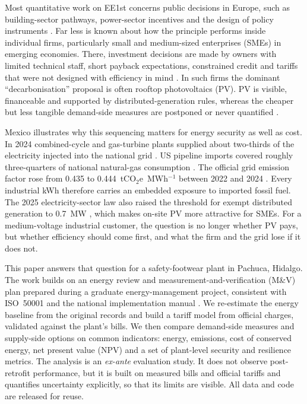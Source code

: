 \documentclass[preprint,12pt,authoryear]{elsarticle}
\begin{document}
Most quantitative work on EE1st concerns public decisions in Europe, such as building-sector pathways, power-sector incentives and the design of policy instruments \citep{mandel2022,pato2022,mandel2023,mandel2024}. Far less is known about how the principle performs inside individual firms, particularly small and medium-sized enterprises (SMEs) in emerging economies. There, investment decisions are made by owners with limited technical staff, short payback expectations, constrained credit and tariffs that were not designed with efficiency in mind \citep{cagno2013,trianni2017,kalantzis2019,zhang2025credit,herce2024}. In such firms the dominant ``decarbonisation'' proposal is often rooftop photovoltaics (PV). PV is visible, financeable and supported by distributed-generation rules, whereas the cheaper but less tangible demand-side measures are postponed or never quantified \citep{fleiter2012,thollander2025}.

Mexico illustrates why this sequencing matters for energy security as well as cost. In 2024 combined-cycle and gas-turbine plants supplied about two-thirds of the electricity injected into the national grid \citep{sener2025plan}. US pipeline imports covered roughly three-quarters of national natural-gas consumption \citep{eia2025mexico}. The official grid emission factor rose from 0.435 to 0.444~tCO$_2$e~MWh$^{-1}$ between 2022 and 2024 \citep{cre2023fesen2022,cre2024fesen2023,semarnat2025fesen}. Every industrial kWh therefore carries an embedded exposure to imported fossil fuel. The 2025 electricity-sector law also raised the threshold for exempt distributed generation to 0.7~MW \citep{lse2025}, which makes on-site PV more attractive for SMEs. For a medium-voltage industrial customer, the question is no longer whether PV pays, but whether efficiency should come first, and what the firm and the grid lose if it does not.

This paper answers that question for a safety-footwear plant in Pachuca, Hidalgo. The work builds on an energy review and measurement-and-verification (M\&V) plan prepared during a graduate energy-management project, consistent with ISO~50001 and the national implementation manual \citep{iso50001,conuee2022}. We re-estimate the energy baseline from the original records and build a tariff model from official charges, validated against the plant's bills. We then compare demand-side measures and supply-side options on common indicators: energy, emissions, cost of conserved energy, net present value (NPV) and a set of plant-level security and resilience metrics. The analysis is an \emph{ex-ante} evaluation study. It does not observe post-retrofit performance, but it is built on measured bills and official tariffs and quantifies uncertainty explicitly, so that its limits are visible. All data and code are released for reuse.
\end{document}
